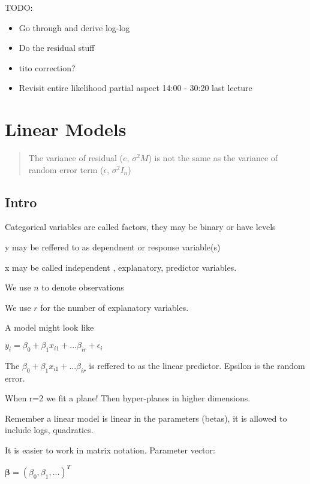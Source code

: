 \documentclass[
  letterpaper,
  DIV=11,
  numbers=noendperiod]{scrreprt}
\providecommand{\tightlist}{%
  \setlength{\itemsep}{0pt}\setlength{\parskip}{0pt}}\usepackage{longtable,booktabs,array}
\begin{document}
TODO:

\begin{itemize}
\tightlist
\item
  Go through and derive log-log
\item
  Do the residual stuff
\item
  tito correction?
\item
  Revisit entire likelihood partial aspect 14:00 - 30:20 last lecture
\end{itemize}


\hypertarget{linear-models}{%
\chapter{Linear Models}\label{linear-models}}

\begin{quote}
The variance of residual (\(e\), \(\sigma^2M\)) is not the same as the
variance of random error term (\(\epsilon\), \(\sigma^2I_n\))
\end{quote}

\hypertarget{intro}{%
\section{Intro}\label{intro}}

Categorical variables are called factors, they may be binary or have
levels

y may be reffered to as dependnent or response variable(s)

x may be called independent , explanatory, predictor variables.

We use \(n\) to denote observations

We use \(r\) for the number of explanatory variables.

A model might look like

\(y_i = \beta_0 + \beta_1x_{i1} + ... \beta_{ir} + \epsilon_i\)

The \(\beta_0 + \beta_1x_{i1} + ... \beta_{ir}\) is reffered to as the
linear predictor. Epsilon is the random error.

When r=2 we fit a plane! Then hyper-planes in higher dimensions.

Remember a linear model is linear in the parameters (betas), it is
allowed to include logs, quadratics.

It is easier to work in matrix notation. Parameter vector:

\(\boldsymbol{\beta} = (\beta_0, \beta_1, ...)^T\)
\end{document}
